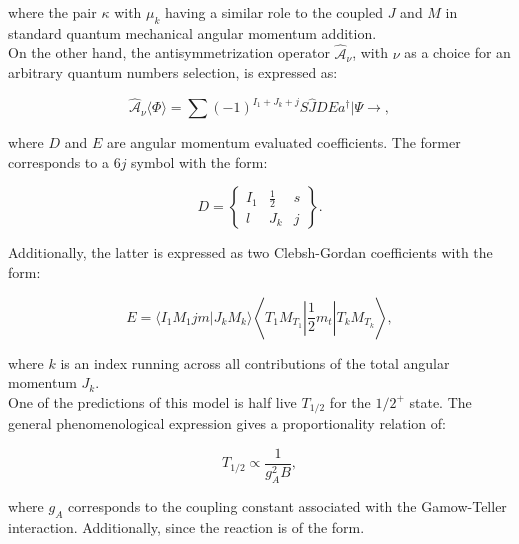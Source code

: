 \documentclass[openany]{book}
\begin{document}
where the pair $\kappa$ with $\mu_k$ having a similar role to the coupled $J$ and $M$ in standard quantum mechanical angular momentum addition.  \\

On the other hand, the antisymmetrization operator $\hat{\mathcal{A}}_\nu$, with $\nu$ as a choice for an arbitrary quantum numbers selection, is expressed as: 

\begin{equation}\label{eq:micro_NCSM_beta_antisymmetrization}
	\hat {\mathcal{A}}_\nu  \langle \Phi \rangle  = \sum { (-1)^{I_1 + J_k + j} \hat S \hat J D E a^{\dagger} | \Psi \rightarrow },
\end{equation}

where $D$ and $E$ are angular momentum evaluated coefficients. The former corresponds to a $6j$ symbol with the form: 

\begin{equation}\label{eq:micro_NCSM_beta_antisymmetrization_9j}
	D = \left \{  \begin{matrix}
		I_1 & \frac{1}{2} & s \\
		l 		& J_k & j
	\end{matrix}   \right \}. 
\end{equation}

Additionally, the latter is expressed as two Clebsh-Gordan coefficients with the form: 

\begin{equation}\label{eq:micro_NCSM_beta_antisymmetrization_clebshGordan}
	E =  \langle I_1 M_1 jm |  J_kM_k  \rangle \left \langle T_1 M_{T_1} \left| \frac{1}{2} m_t \right|  T_k M_{T_k} \right  \rangle,
\end{equation}

where $k$ is an index running across all contributions of the total angular momentum $J_k$.  \\

One of the predictions of this model is half live $T_{1/2}$ for the $1/2^{+}$ state. The general phenomenological expression gives a proportionality relation of: 

 \begin{equation}\label{eq:micro_NCSH_beta_halflive}
	T_{1/2} \propto \frac{1}{g^2_A B},
\end{equation}

where $g_A$ corresponds to the coupling constant associated with the Gamow-Teller interaction. Additionally, since the reaction is of the form.\\
\end{document}

